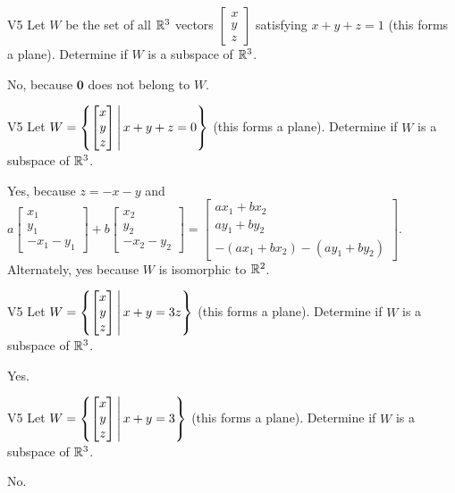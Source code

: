 \begin{problem}{V5} Let \(W\) be the set of all \(\mathbb{R}^3\) vectors
\(\begin{bmatrix} x \\ y \\ z \end{bmatrix}\)
satisfying \(x+y+z=1\) (this forms a plane).
Determine if \(W\) is a subspace of \(\mathbb{R}^3\).
\end{problem}
\begin{solution}
No, because \(\mathbf{0}\) does not belong to \(W\).
\end{solution}


\begin{problem}{V5} Let \(W= \left\{\begin{bmatrix} x \\ y \\ z \end{bmatrix}\,\middle|\,x+y+z=0\right\}\) (this forms a plane).
Determine if \(W\) is a subspace of \(\mathbb{R}^3\).
\end{problem}
\begin{solution}
Yes, because \(z=-x-y\) and
\(
  a\begin{bmatrix} x_1 \\ y_1 \\ -x_1-y_1 \end{bmatrix}+
  b\begin{bmatrix} x_2 \\ y_2 \\ -x_2-y_2 \end{bmatrix}=
  \begin{bmatrix}
    ax_1+bx_2 \\
    ay_1+by_2 \\
    -(ax_1+bx_2)-(ay_1+by_2)
  \end{bmatrix}
\).
Alternately, yes because \(W\) is isomorphic to \(\mathbb{R}^2\).
\end{solution}

\begin{problem}{V5} Let \(W= \left\{\begin{bmatrix} x \\ y \\ z \end{bmatrix}\,\middle|\,x+y=3z\right\}\) (this forms a plane).
Determine if \(W\) is a subspace of \(\mathbb{R}^3\).
\end{problem}
\begin{solution}
Yes.
\end{solution}

\begin{problem}{V5} Let \(W= \left\{\begin{bmatrix} x \\ y \\ z \end{bmatrix}\,\middle|\,x+y=3\right\}\) (this forms a plane).
Determine if \(W\) is a subspace of \(\mathbb{R}^3\).
\end{problem}
\begin{solution}
No.
\end{solution}


